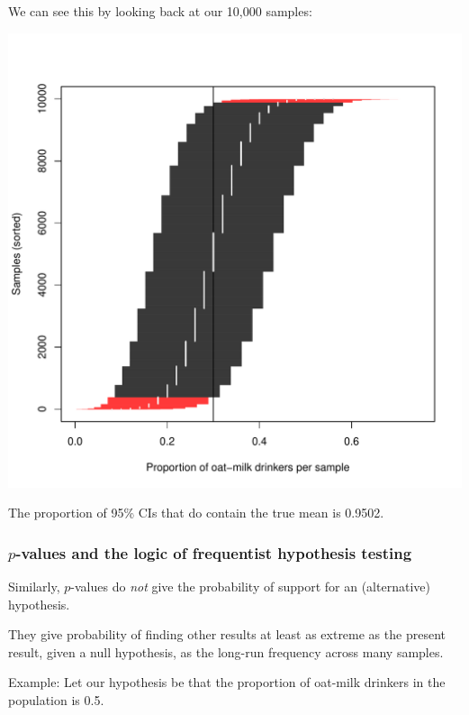 \documentclass[
  11pt,
]{article}
\begin{document}
We can see this by looking back at our 10,000 samples:

\begin{center}\includegraphics{01-01-lec_files/figure-latex/sim-cis-1} \end{center}

The proportion of 95\% CIs that do contain the true mean is 0.9502.

\hypertarget{p-values-and-the-logic-of-frequentist-hypothesis-testing}{%
\subsubsection{\texorpdfstring{\(p\)-values and the logic of frequentist hypothesis testing}{p-values and the logic of frequentist hypothesis testing}}\label{p-values-and-the-logic-of-frequentist-hypothesis-testing}}

Similarly, \(p\)-values do \emph{not} give the probability of support for an (alternative) hypothesis.

They give probability of finding other results at least as extreme as the present result, given a null hypothesis, as the long-run frequency across many samples.

Example: Let our hypothesis be that the proportion of oat-milk drinkers in the population is 0.5.
\end{document}

